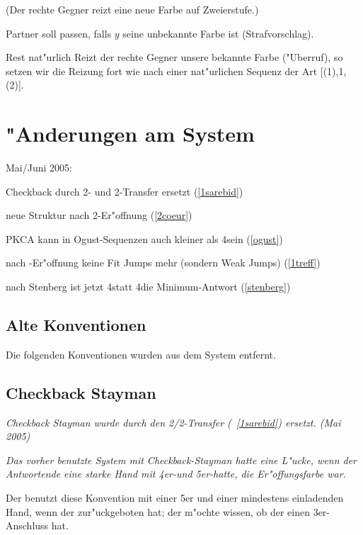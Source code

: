 \begin{appendix}
		(Der rechte Gegner reizt eine neue Farbe auf Zweierstufe.)
		\bdsc
			\item[\kontra] Partner soll passen, falls $y$ seine unbekannte
				Farbe ist (Strafvorschlag).
			\item[Rest] nat"urlich
		\edsc
\edsc
Reizt der rechte Gegner unsere bekannte Farbe ("Uberruf), so setzen wir die
Reizung fort wie nach einer nat"urlichen Sequenz der Art
[(1\coe{})\sep1\pik{}\sep(2\pik)].

\section{"Anderungen am System}

Mai/Juni 2005:
\begin{compactitem}
\item Checkback durch 2\tre- und 2\SA-Transfer ersetzt (\ra \ref{1sarebid})
\item neue Struktur nach 2\coe-Er"offnung (\ra \ref{2coeur})
\item PKCA kann in Ogust-Sequenzen auch kleiner als 4\tre sein (\ra \ref{ogust})
\item nach \ufa-Er"offnung keine Fit Jumps mehr (sondern Weak Jumps) (\ra \ref{1treff})
\item nach Stenberg ist jetzt 4\tre statt 4\of die Minimum-Antwort (\ra \ref{stenberg})
\end{compactitem}

\subsection{Alte Konventionen}

Die folgenden Konventionen wurden aus dem System entfernt.

\subsection*{Checkback Stayman}

\emph{Checkback Stayman wurde durch den 2\tre/2\SA-Transfer (\ra~\ref{1sarebid})
ersetzt. (Mai 2005)}

\emph{Das vorher benutzte System mit Checkback-Stayman hatte eine L"ucke, wenn der Antwortende
eine starke Hand mit 4er-\ofa und 5er-\ufa hatte, die Er"offungsfarbe war.}

Der \aw benutzt diese Konvention mit einer 5er \ofa und einer mindestens
einladenden Hand, wenn der \SA zur"uckgeboten hat; der \aw m"ochte
wissen, ob der \eo einen 3er-Anschluss hat.


\end{appendix}
